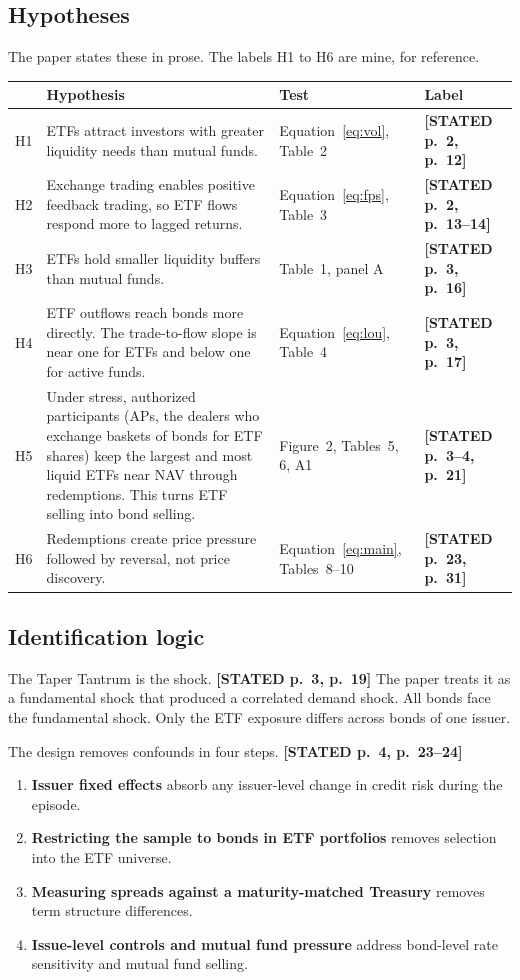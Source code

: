 \documentclass[10pt,a4paper]{article}
\newcommand{\ST}[1]{\textcolor{cst}{\textbf{[STATED #1]}}}
\begin{document}
\subsection{Hypotheses}
The paper states these in prose. The labels H1 to H6 are mine, for reference.
\begin{longtable}{@{}P{0.6cm}P{7.6cm}P{3.5cm}P{4.6cm}@{}}
\toprule
& Hypothesis & Test & Label\\
\midrule\endhead
H1 & ETFs attract investors with greater liquidity needs than mutual funds. & Equation~\eqref{eq:vol}, Table~2 & \ST{p.~2, p.~12}\\
H2 & Exchange trading enables positive feedback trading, so ETF flows respond more to lagged returns. & Equation~\eqref{eq:fps}, Table~3 & \ST{p.~2, p.~13--14}\\
H3 & ETFs hold smaller liquidity buffers than mutual funds. & Table~1, panel A & \ST{p.~3, p.~16}\\
H4 & ETF outflows reach bonds more directly. The trade-to-flow slope is near one for ETFs and below one for active funds. & Equation~\eqref{eq:lou}, Table~4 & \ST{p.~3, p.~17}\\
H5 & Under stress, authorized participants (APs, the dealers who exchange baskets of bonds for ETF shares) keep the largest and most liquid ETFs near NAV through redemptions. This turns ETF selling into bond selling. & Figure~2, Tables~5, 6, A1 & \ST{p.~3--4, p.~21}\\
H6 & Redemptions create price pressure followed by reversal, not price discovery. & Equation~\eqref{eq:main}, Tables~8--10 & \ST{p.~23, p.~31}\\
\bottomrule
\end{longtable}

\subsection{Identification logic}
The Taper Tantrum is the shock. \ST{p.~3, p.~19} The paper treats it as a fundamental shock that produced a correlated demand shock. All bonds face the fundamental shock. Only the ETF exposure differs across bonds of one issuer.

The design removes confounds in four steps. \ST{p.~4, p.~23--24}
\begin{enumerate}
\item \textbf{Issuer fixed effects} absorb any issuer-level change in credit risk during the episode.
\item \textbf{Restricting the sample to bonds in ETF portfolios} removes selection into the ETF universe.
\item \textbf{Measuring spreads against a maturity-matched Treasury} removes term structure differences.
\item \textbf{Issue-level controls and mutual fund pressure} address bond-level rate sensitivity and mutual fund selling.
\end{enumerate}
\end{document}
